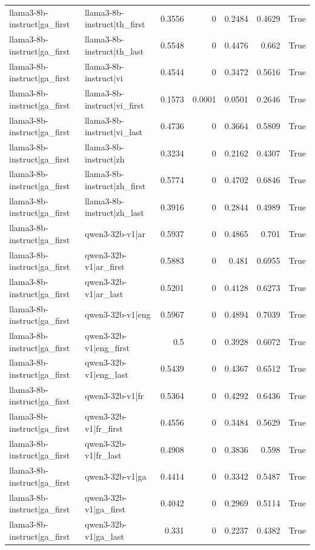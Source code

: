 \begin{table}
\begin{tabular}{l l r r r r l}
llama3-8b-instruct|ga_first & llama3-8b-instruct|th_first & 0.3556 & 0 & 0.2484 & 0.4629 & True \\
llama3-8b-instruct|ga_first & llama3-8b-instruct|th_last & 0.5548 & 0 & 0.4476 & 0.662 & True \\
llama3-8b-instruct|ga_first & llama3-8b-instruct|vi & 0.4544 & 0 & 0.3472 & 0.5616 & True \\
llama3-8b-instruct|ga_first & llama3-8b-instruct|vi_first & 0.1573 & 0.0001 & 0.0501 & 0.2646 & True \\
llama3-8b-instruct|ga_first & llama3-8b-instruct|vi_last & 0.4736 & 0 & 0.3664 & 0.5809 & True \\
llama3-8b-instruct|ga_first & llama3-8b-instruct|zh & 0.3234 & 0 & 0.2162 & 0.4307 & True \\
llama3-8b-instruct|ga_first & llama3-8b-instruct|zh_first & 0.5774 & 0 & 0.4702 & 0.6846 & True \\
llama3-8b-instruct|ga_first & llama3-8b-instruct|zh_last & 0.3916 & 0 & 0.2844 & 0.4989 & True \\
llama3-8b-instruct|ga_first & qwen3-32b-v1|ar & 0.5937 & 0 & 0.4865 & 0.701 & True \\
llama3-8b-instruct|ga_first & qwen3-32b-v1|ar_first & 0.5883 & 0 & 0.481 & 0.6955 & True \\
llama3-8b-instruct|ga_first & qwen3-32b-v1|ar_last & 0.5201 & 0 & 0.4128 & 0.6273 & True \\
llama3-8b-instruct|ga_first & qwen3-32b-v1|eng & 0.5967 & 0 & 0.4894 & 0.7039 & True \\
llama3-8b-instruct|ga_first & qwen3-32b-v1|eng_first & 0.5 & 0 & 0.3928 & 0.6072 & True \\
llama3-8b-instruct|ga_first & qwen3-32b-v1|eng_last & 0.5439 & 0 & 0.4367 & 0.6512 & True \\
llama3-8b-instruct|ga_first & qwen3-32b-v1|fr & 0.5364 & 0 & 0.4292 & 0.6436 & True \\
llama3-8b-instruct|ga_first & qwen3-32b-v1|fr_first & 0.4556 & 0 & 0.3484 & 0.5629 & True \\
llama3-8b-instruct|ga_first & qwen3-32b-v1|fr_last & 0.4908 & 0 & 0.3836 & 0.598 & True \\
llama3-8b-instruct|ga_first & qwen3-32b-v1|ga & 0.4414 & 0 & 0.3342 & 0.5487 & True \\
llama3-8b-instruct|ga_first & qwen3-32b-v1|ga_first & 0.4042 & 0 & 0.2969 & 0.5114 & True \\
llama3-8b-instruct|ga_first & qwen3-32b-v1|ga_last & 0.331 & 0 & 0.2237 & 0.4382 & True \\

\end{tabular}
\end{table}
